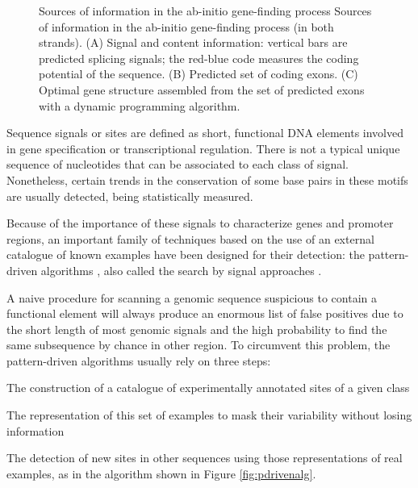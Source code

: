 \begin{figure}[t!]
\begin{center}
\setlength{\fboxsep}{1pt}
          {Sources of information in the ab-initio gene-finding process}%
          {Sources of information in the ab-initio gene-finding process (in both strands).}%
          {(A) Signal and content information: vertical bars are predicted splicing signals; the red-blue code
measures the coding potential of the sequence. (B) Predicted set of coding exons. (C) Optimal gene
structure assembled from the set of predicted exons with a dynamic programming algorithm.}
\end{center}
\end{figure}

\label{sec:pdriven}

Sequence signals  
or sites  are defined as short, functional DNA 
elements involved in gene specification or transcriptional regulation. There is not a typical unique 
sequence of nucleotides that can be associated to each class of signal. Nonetheless,
certain trends in the conservation of some base pairs in these motifs are usually
detected, being statistically measured.

Because of the importance of these signals to characterize genes and promoter regions, 
an important family of techniques based on the use of an external catalogue of known examples
have been designed for their detection: the pattern-driven algorithms \citep{brazma:1998a}, also 
called the search by signal approaches \citep{blanco:2005a}.

A naive procedure for scanning a genomic sequence suspicious to contain a functional 
element will always produce an enormous list of false positives due to the short length
of most genomic signals and the high probability to find the same subsequence by chance
in other region. To circumvent this problem, the pattern-driven algorithms usually rely on 
three steps: 
\begin{menumerate}
\item
The construction of a catalogue of experimentally annotated sites of a given class
\item
The representation of this set of examples to mask their variability without losing information
\item
The detection of new sites in other sequences using those representations of real examples, as
in the algorithm shown in Figure \ref{fig:pdrivenalg}.
\end{menumerate}

